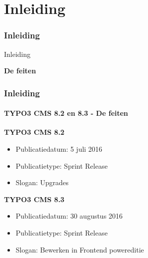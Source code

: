 %

\section{Inleiding}
\begin{frame}[fragile]
	\frametitle{Inleiding}

	\begin{center}\huge{Inleiding}\end{center}
	\begin{center}\huge{\color{typo3darkgrey}\textbf{De feiten}}\end{center}

\end{frame}

\begin{frame}[fragile]
	\frametitle{Inleiding}
	\framesubtitle{TYPO3 CMS 8.2 en 8.3 - De feiten}

	\textbf{TYPO3 CMS 8.2}
	\begin{itemize}
		\item Publicatiedatum: 5 juli 2016
		\item Publicatietype: Sprint Release
		\item Slogan: Upgrades
	\end{itemize}

	\vspace{0.6cm}

	\textbf{TYPO3 CMS 8.3}
	\begin{itemize}
		\item Publicatiedatum: 30 augustus 2016
		\item Publicatietype: Sprint Release
		\item Slogan: Bewerken in Frontend powereditie
	\end{itemize}


\end{frame}


